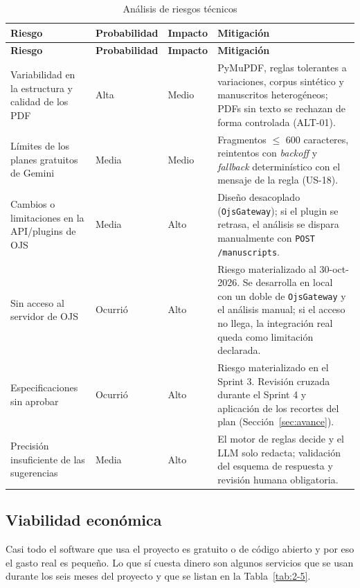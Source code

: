 {\small
\begin{longtable}{@{}>{\raggedright\arraybackslash}p{}>{\raggedright\arraybackslash}p{}>{\raggedright\arraybackslash}p{}>{\raggedright\arraybackslash}p{}@{}}
\caption{Análisis de riesgos técnicos}\label{tab:2-4}\\
\toprule
\textbf{Riesgo} & \textbf{Probabilidad} & \textbf{Impacto} & \textbf{Mitigación} \\
\midrule
\endfirsthead
\toprule
\textbf{Riesgo} & \textbf{Probabilidad} & \textbf{Impacto} & \textbf{Mitigación} \\
\midrule
\endhead
\bottomrule
\endfoot
\endlastfoot
Variabilidad en la estructura y calidad de los PDF & Alta & Medio & PyMuPDF, reglas tolerantes a variaciones, corpus sintético y manuscritos heterogéneos; PDFs sin texto se rechazan de forma controlada (ALT-01). \\
Límites de los planes gratuitos de Gemini & Media & Medio & Fragmentos $\leq$ 600 caracteres, reintentos con \emph{backoff} y \emph{fallback} determinístico con el mensaje de la regla (US-18). \\
Cambios o limitaciones en la API/plugins de OJS & Media & Alto & Diseño desacoplado (\texttt{OjsGateway}); si el plugin se retrasa, el análisis se dispara manualmente con \texttt{POST /\allowbreak{}manuscripts}. \\
Sin acceso al servidor de OJS & Ocurrió & Alto & Riesgo materializado al 30-oct-2026. Se desarrolla en local con un doble de \texttt{OjsGateway} y el análisis manual; si el acceso no llega, la integración real queda como limitación declarada. \\
Especificaciones sin aprobar & Ocurrió & Alto & Riesgo materializado en el Sprint 3. Revisión cruzada durante el Sprint 4 y aplicación de los recortes del plan (Sección~\ref{sec:avance}). \\
Precisión insuficiente de las sugerencias & Media & Alto & El motor de reglas decide y el LLM solo redacta; validación del esquema de respuesta y revisión humana obligatoria. \\
\end{longtable}
}

\subsection{Viabilidad económica}

Casi todo el software que usa el proyecto es gratuito o de código abierto y por eso el gasto real es pequeño. Lo que sí cuesta dinero son algunos servicios que se usan durante los seis meses del proyecto y que se listan en la Tabla~\ref{tab:2-5}.

